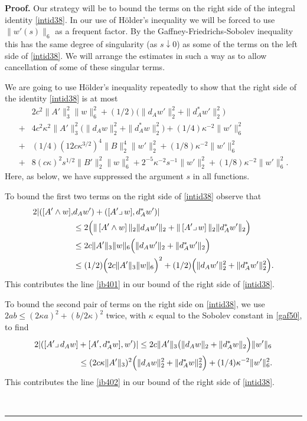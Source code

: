 \documentclass[12pt]{article}
\newenvironment{proof}[1][Proof]{\textbf{#1.} }{\ \rule{0.5em}{0.5em}}
\def \eref{\eqref}
\def \lrc{\lrcorner\,}
\numberwithin{equation}{section}
\begin{document}
     \begin{proof}  
     Our strategy will be to bound the terms on the right side of the integral identity \eref{intid38}.
In our use of H\"older's inequality we will be forced to use 
$\| w'(s)\|_6$    as a frequent factor. By the Gaffney-Friedrichs-Sobolev inequality
this has the same degree of singularity (as $s \downarrow 0$) as some of the terms
on the left side of \eref{intid38}. We will arrange the estimates in such a way as to allow
cancellation of some of these singular terms.  
     
     
\bigskip   
  We are going to use H\"older's inequality repeatedly to show that the right side of 
  the identity \eref{intid38}   is at most
  \begin{align}
  &2c^2 \|A'\|_3^2\|w\|_6^2   + (1/2)  \Big( \|d_A w'\|_2^2 +  \|d_A^*w'\|_2^2\Big)  \label{ib401} \\
+ &4c^2\kappa^2\|A'\|_3^2 \Big( \|d_Aw\|_2^2 + \|d_A^* w\|_2^2 \Big) 
                                                            + (1/4) \kappa^{-2} \|w'\|_6^2 \label{ib402}\\
 +& (1/4)(12c\kappa^{3/2})^4 \|B\|_2^4 \|w'\|_2^2   + (1/8) \kappa^{-2} \|w'\|_6^2  \label{ib403}\\
 +&  8(c\kappa)^2 s^{1/2} \| B'\|_2^2 \| w\|_6^2 +
                   2^{-5} \kappa^{-2}s^{-1} \|w'\|_2^2 +  (1/8) \kappa^{-2}\|w'\|_6^2  .     \label{ib404}
\end{align}
Here, as below, we have suppressed the argument $s$ in all functions.
  
        To bound the first two terms on the right side of \eref{intid38} observe that
                  \begin{align}
 2|([A'\wedge w],&d_A w') + ([A'\lrc w],d_A^* w')|                     \notag \\
 &\le 2\Big( \|\, [A' \wedge w]\,\|_2 \|d_A w'\|_2 +\|\, [A'\lrc w]\,\|_2 \| d_A^* w'\|_2\Big) \notag\\
 & \le 2c  \|A'\|_3  \|w\|_6\Big( \|d_A w'\|_2 + \| d_A^* w'\|_2\Big)       \notag\\
 &\le (1/2) \Big(2c \|A'\|_3\|w\|_6\Big)^2 
           + (1/2)  \Big( \|d_A w'\|_2^2 +  \|d_A^*w'\|_2^2\Big).                   \label{ib551b}
 \end{align}  
 This contributes the line \eref{ib401} in our bound of the right side of \eref{intid38}.
 
      To bound  the second pair of terms on the right side on \eref{intid38},
       we use  $2ab \le (2\kappa a)^2 +(b/2\kappa)^2$ twice, with $\kappa$ equal to the
        Sobolev constant in \eref{gaf50}, to find
 \begin{align}
 2| ( [ A'\lrc d_A  w] &+    [ A', d_A^* w], w')| 
 \le 2c\|A'\|_3 \big( \|d_A w\|_2 + \| d_A^* w \|_2 \Big) \|w'\|_6    \notag\\
 &\le  (2c\kappa\|A'\|_3)^2 \Big( \|d_Aw\|_2^2 + \|d_A^* w\|_2^2 \Big) 
 + (1/4) \kappa^{-2} \|w'\|_6^2.                                                             \label{ib552b}
\end{align} 
This contributes the line \eref{ib402} in our bound of the right side of \eref{intid38}.
 


\end{proof}
\end{document}
